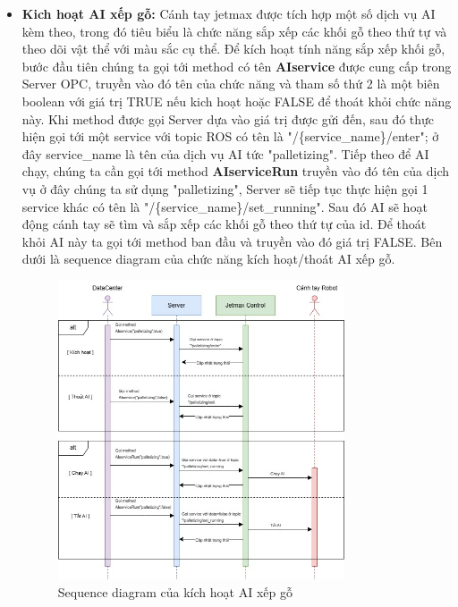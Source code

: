 \begin{itemize}
    \item \textbf{Kich hoạt AI xếp gỗ:} Cánh tay jetmax được tích hợp một số dịch vụ AI kèm theo, trong đó tiêu biểu là chức năng sắp xếp các khối gỗ theo thứ tự và theo dõi vật thể với màu sắc cụ thể. Để kích hoạt tính năng sắp xếp khối gỗ, bước đầu tiên chúng ta gọi tới method có tên \textbf{AIservice} được cung cấp trong Server OPC, truyền vào đó tên của chức năng và tham số thứ 2 là một biên boolean với giá trị TRUE nếu kich hoạt hoặc FALSE để thoát khỏi chức năng này. Khi method được gọi Server dựa vào giá trị được gửi đến, sau đó thực hiện gọi tới một service với topic ROS có tên là "/\{service\_name\}/enter"; ở đây service\_name là tên của dịch vụ AI tức "palletizing". Tiếp theo để AI chạy, chúng ta cần gọi tới method \textbf{AIserviceRun} truyền vào đó tên của dịch vụ ở đây chúng ta sử dụng "palletizing", Server sẽ tiếp tục thực hiện gọi 1 service khác có tên là "/\{service\_name\}/set\_running". Sau đó AI sẽ hoạt động cánh tay sẽ tìm và sắp xếp các khối gỗ theo thứ tự của id. Để thoát khỏi AI này ta gọi tới method ban đầu và truyền vào đó giá trị FALSE. Bên dưới là sequence diagram của chức năng kích hoạt/thoát AI xếp gỗ.
    \begin{figure}[!h]
        \centering
        \includegraphics[width=0.8\textwidth]{Images/Implementation/Control/palletizing.jpg}
        \caption{Sequence diagram của kích hoạt AI xếp gỗ}
    \end{figure}

    \newpage
    

\end{itemize}
